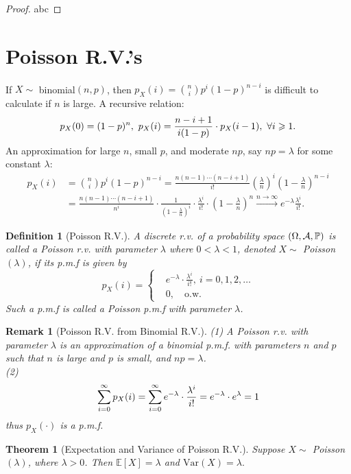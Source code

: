 \documentclass[openany,12pt]{book}
\newtheorem{theorem}{Theorem}[chapter]
\newtheorem{remark}{Remark}[chapter]
\newtheorem{definition}{Definition}[chapter]
\begin{document}
\begin{proof}
  abc
\end{proof}

\section{Poisson R.V.'s}

If $X\sim$ binomial$(n,p)$, then $p_X (i)=\binom n i p^i (1-p)^{n-i}$ is difficult to calculate if $n$ is large. A recursive relation: 
$$p_X (0)=(1-p)^n, \ p_X (i)=\frac{n-i+1}{i(1-p)} \cdot p_X (i-1),\ \forall i\geqslant1.$$
An approximation for large $n$, small $p$, and moderate $np$, say $np=\lambda$ for some constant $\lambda$:
$$
\begin{aligned}
p_X (i)&=\binom n i p^i (1-p)^{n-i}=\frac{n(n-1)\cdots(n-i+1)}{i!}\left(\frac{\lambda}{n}\right)^i \left(1-\frac{\lambda}{n} \right)^{n-i}\\
&=\frac{n(n-1)\cdots(n-i+1)}{n^i}\cdot\frac{1}{\left(1-\frac{\lambda}{n}\right)^i }\cdot\frac{\lambda^i}{i!}\cdot\left(1-\frac{\lambda}{n}\right)^n  \xrightarrow{n\to\infty}e^{-\lambda} \frac{\lambda^i}{i!}.
\end{aligned}
$$

\begin{definition}[Poisson R.V.]
A discrete r.v. of a probability space $(\Omega,\mathcal{A},\mathbb{P})$ is called a Poisson r.v. with parameter $\lambda$ where $0<\lambda<1$, denoted $X\sim$ Poisson$(\lambda)$, if its p.m.f is given by
$$
p_X (i)=
\left\{\begin{aligned}
&e^{-\lambda}\cdot \frac{\lambda^i}{i!}, \ i=0,1,2,\dots\\
&0,\quad\text{o.w.}
\end{aligned}           
\right.
$$
Such a p.m.f is called a Poisson p.m.f with parameter $\lambda$.
\end{definition}

\begin{remark}[Poisson R.V. from Binomial R.V.]
(1) A Poisson r.v. with parameter $\lambda$ is an approximation of a binomial p.m.f. with parameters $n$ and $p$ such that $n$ is large and $p$ is small, and $np=\lambda$.\\
(2)
$$
\sum_{i=0}^{\infty} p_X (i)=\sum_{i=0}^{\infty} e^{-\lambda} \cdot\frac{\lambda^i}{i!}=e^{-\lambda}\cdot e^{\lambda}=1 
$$
thus $p_X (\cdot)$ is a p.m.f.
\end{remark}

\begin{theorem}[Expectation and Variance of Poisson R.V.]
Suppose $X\sim$ Poisson$(\lambda)$, where $\lambda>0$. Then $\mathbb{E}[X]=\lambda$ and $\mathrm{Var}(X)=\lambda.$
\end{theorem}
\end{document}
